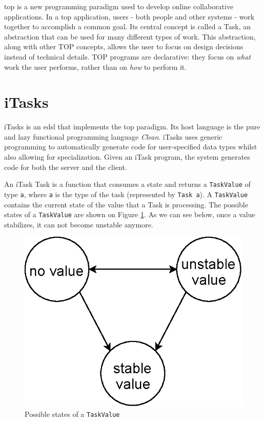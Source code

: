 \acf{top} is a new programming paradigm used to develop online collaborative applications. In a \acs{top} application, users - both people and other systems - work together to accomplish a common goal. Its central concept is called a Task, an abstraction that can be used for many different types of work. This abstraction, along with other TOP concepts, allows the user to focus on design decisions instead of technical details. TOP programs are declarative: they focus on \textit{what} work the user performs, rather than on \textit{how} to perform it.

\section{iTasks}\label{itasks}
iTasks is an \acs{edsl} that implements the \acs{top} paradigm. Its host language is the pure and lazy functional programming language \textit{Clean}. iTasks uses generic programming to automatically generate code for user-specified data types whilst also allowing for specialization. Given an iTask program, the system generates code for both the server and the client.

An iTask Task is a function that consumes a state and returns a \texttt{TaskValue} of type \texttt{a}, where \texttt{a} is the type of the task (represented by \texttt{Task a}). A \texttt{TaskValue} contains the current state of the value that a Task is processing. The possible states of a \texttt{TaskValue} are shown on Figure \ref{fig:task_value}. As we can see below, once a value stabilizes, it can not become unstable anymore.


\begin{figure}[H]
\begin{center}
\includegraphics[scale=0.7]{thesis/img/task_value.eps}
\end{center}
\caption{Possible states of a \texttt{TaskValue}}
\label{fig:task_value}
\end{figure}

